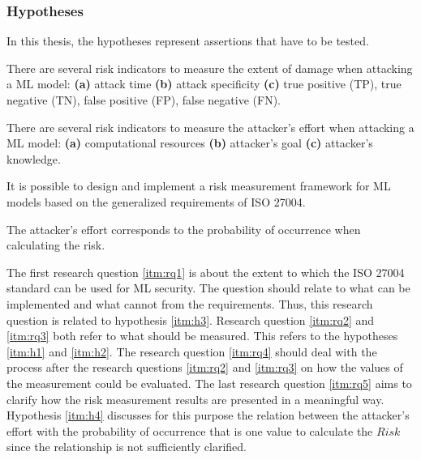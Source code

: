 \subsubsection*{Hypotheses}

In this thesis, the hypotheses represent assertions that have to be tested.


\begin{hypotheses}
  \item There are several risk indicators to measure the extent of damage when attacking a ML model: \textbf{(a)} attack time \textbf{(b)} attack specificity \textbf{(c)} true positive (TP), true negative (TN), false positive (FP), false negative (FN). \label{itm:h1}
  \item There are several risk indicators to measure the attacker's effort when attacking a ML model: \textbf{(a)} computational resources \textbf{(b)} attacker's goal \textbf{(c)} attacker's knowledge. \label{itm:h2}
  \item It is possible to design and implement a risk measurement framework for ML models based on the generalized requirements of ISO 27004. \label{itm:h3}
  \item The attacker's effort corresponds to the probability of occurrence when calculating the risk. \label{itm:h4}
\end{hypotheses}

The first research question \ref{itm:rq1} is about the extent to which the ISO 27004 standard can be used for ML security. The question should relate to what can be implemented and what cannot from the requirements. Thus, this research question is related to hypothesis \ref{itm:h3}. Research question \ref{itm:rq2} and \ref{itm:rq3} both refer to what should be measured. This refers to the hypotheses \ref{itm:h1} and \ref{itm:h2}. The research question \ref{itm:rq4} should deal with the process after the research questions \ref{itm:rq2} and \ref{itm:rq3} on how the values of the measurement could be
evaluated. The last research question \ref{itm:rq5} aims to clarify how the risk measurement results are presented in a meaningful way. Hypothesis \ref{itm:h4} discusses for this purpose the relation between the attacker's effort with the probability of occurrence that is one value to calculate the $Risk$ since the relationship is not sufficiently clarified.

